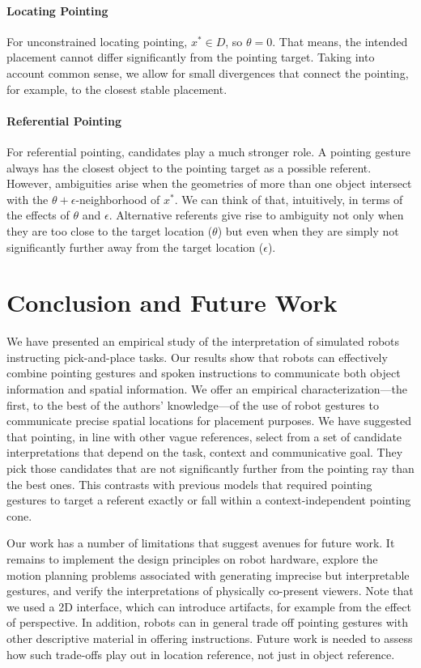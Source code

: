 \paragraph{Locating Pointing}  For unconstrained locating pointing, $x^* \in D$, so $\theta=0$.  That means, the intended placement cannot differ significantly from the pointing target.  Taking into account common sense, we allow for small divergences that connect the pointing, for example, to the closest stable placement.

\paragraph{Referential Pointing}  For referential pointing, candidates play a much stronger role.  A pointing gesture always has the closest object to the pointing target as a possible referent.  However, ambiguities arise when the geometries of more than one object intersect with the $\theta+\epsilon$-neighborhood of $x^*$.   We can think of that, intuitively, in terms of the effects of $\theta$ and $\epsilon$.  Alternative referents give rise to ambiguity not only when they are too close to the target location ($\theta$) but even when they are simply not significantly further away from the target location ($\epsilon$).  



\section{Conclusion and Future Work}
\label{conclusion}

We have presented an empirical study of the interpretation of simulated robots instructing pick-and-place tasks.  Our results show that robots can effectively combine pointing gestures and spoken instructions to communicate both object information and spatial information. We offer an empirical characterization---the first, to the best of the authors' knowledge---of the use of robot gestures to communicate precise spatial locations for placement purposes.  We have suggested that pointing, in line with other vague references, select from a set of candidate interpretations that depend on the task, context and communicative goal.  They pick those candidates that are not significantly further from the pointing ray than the best ones.  This contrasts with previous models that required pointing gestures to target a referent exactly or fall within a context-independent pointing cone.

Our work has a number of limitations that suggest avenues for future work.   It remains to implement the design principles on robot hardware, explore the motion planning problems associated with generating imprecise but interpretable gestures, and verify the interpretations of physically co-present viewers.  Note that we used a 2D interface, which can introduce artifacts, for example from the effect of perspective.  In addition, robots can in general trade off pointing gestures with other descriptive material in offering instructions.  Future work is needed to assess how such trade-offs play out in location reference, not just in object reference.

